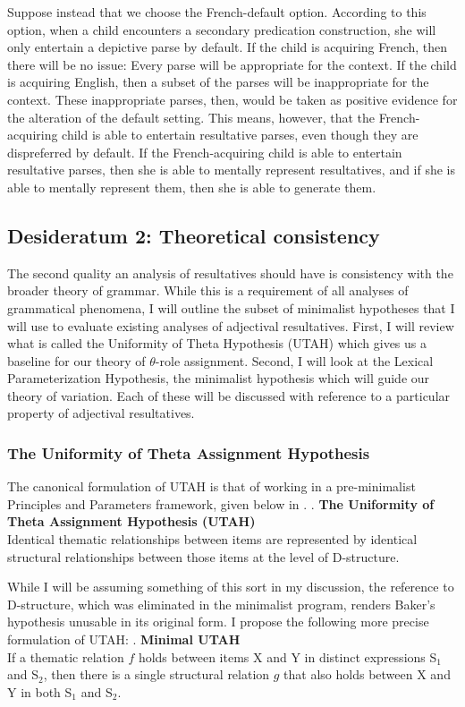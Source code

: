 \documentclass[MilwayThesis]{subfiles}
\begin{document}
Suppose instead that we choose the French-default option.
According to this option, when a child encounters a secondary predication construction, she will only entertain a depictive parse by default.
If the child is acquiring French, then there will be no issue:
Every parse will be appropriate for the context.
If the child is acquiring English, then a subset of the parses will be inappropriate for the context.
These inappropriate parses, then, would be taken as positive evidence for the alteration of the default setting.
This means, however, that the French-acquiring child is able to entertain resultative parses, even though they are dispreferred by default.
If the French-acquiring child is able to entertain resultative parses, then she is able to mentally represent resultatives, and if she is able to mentally represent them, then she is able to generate them.

\subsection{Desideratum 2: Theoretical consistency}
The second quality an analysis of resultatives should have is consistency with the broader theory of grammar.
While this is a requirement of all analyses of grammatical phenomena, I will outline the subset of minimalist hypotheses that I will use to evaluate existing analyses of adjectival resultatives.
First, I will review what is called the Uniformity of Theta Hypothesis (UTAH) which gives us a baseline for our theory of $\theta$-role assignment.
Second, I will look at the Lexical Parameterization Hypothesis, the minimalist hypothesis which will guide our theory of variation.
Each of these will be discussed with reference to a particular property of adjectival resultatives.

\subsubsection{The Uniformity of Theta Assignment Hypothesis}
The canonical formulation of UTAH is that of \textcite{baker1988incorporation} working in a pre-minimalist Principles and Parameters framework, given below in \Next.
\ex. \textbf{The Uniformity of Theta Assignment Hypothesis (UTAH)}\\
Identical thematic relationships between items are represented by identical structural relationships between those items at the level of D-structure. \parencite[46]{baker1988incorporation}

While I will be assuming something of this sort in my discussion, the reference to D-structure, which was eliminated in the minimalist program, renders Baker's hypothesis unusable in its original form.
I propose the following more precise formulation of UTAH:
\ex. \textbf{Minimal UTAH}\\
If a thematic relation $f$ holds between items X and Y in distinct expressions S$_1$ and S$_2$, then there is a single structural relation $g$ that also holds between X and Y in both S$_1$ and S$_2$.
\end{document}
